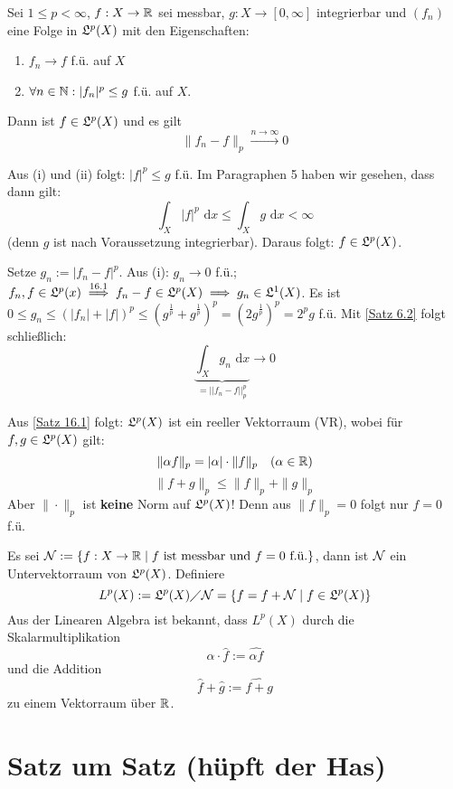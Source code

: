 \documentclass[a4paper,twoside,DIV15,BCOR12mm,chapterprefix=true,headings=onelinechapter]{scrbook}
\begin{document}
\begin{satz}
\label{Satz 16.3}
Sei $1\le p<\infty$, $f:X\to\mathbb{R}$ sei messbar, $g:X\to[0,\infty]$ integrierbar und $(f_n)$ eine Folge in $\mathfrak{L}^p(X)$ mit den Eigenschaften:
\begin{enumerate}
\item $f_n\to f$ f.ü. auf $X$
\item $\forall n\in\mathbb{N}: |f_n|^p\le g$ f.ü. auf $X$.
\end{enumerate}
Dann ist $f\in\mathfrak{L}^p(X)$ und es gilt
\[\|f_n-f\|_p\stackrel{n\to\infty}\to 0\]
\end{satz}

\begin{beweis}
Aus (i) und (ii) folgt: $|f|^p \leq g$ f.\"u.
Im Paragraphen 5 haben wir gesehen, dass dann gilt:
\[ \int_X |f|^p \text{ d}x \leq \int_X g \text{ d}x < \infty \]
(denn $g$ ist nach Voraussetzung integrierbar). 
Daraus folgt: $f \in \mathfrak{L}^p(X)$.

Setze $g_n := |f_n - f|^p$. Aus (i): $g_n \to 0$ f.\"u.; $f_n, f \in \mathfrak{L}^p(x) \overset{16.1}{\implies} f_n - f \in \mathfrak{L}^p(X) \implies g_n \in \mathfrak{L}^1(X)$.
Es ist $ 0 \leq g_n \leq \left( |f_n| + |f| \right)^p \leq \left( g^{\frac{1}{p}} + g^{\frac{1}{p}} \right)^p = \left( 2g^{\frac{1}{p}} \right)^p = 2^p g$ f.\"u.
Mit \ref{Satz 6.2} folgt schließlich:
\[ \underbrace{\int_X g_n \text{ d}x}_{=||f_n - f||_p^p} \to 0 \]
\end{beweis}

Aus \ref{Satz 16.1} folgt: $\mathfrak{L}^p(X)$ ist ein reeller Vektorraum (VR), wobei für $f,g\in\mathfrak{L}^p(X)$ gilt:
\[\|\alpha f\|_p=|\alpha|\cdot \|f\|_p\quad (\alpha\in\mathbb{R})\]
\[\|f+g\|_p\le\|f\|_p+\|g\|_p\]
Aber $\|\cdot\|_p$ ist \textbf{keine} Norm auf $\mathfrak{L}^p(X)$! Denn aus $\|f\|_p=0$ folgt nur $f=0$ f.ü.

\begin{definition}
Es sei $\mathcal{N}:=\{f:X\to\mathbb{R}\mid f\text{ ist messbar und } f=0 \text{ f.ü.}\}$, dann ist $\mathcal{N}$ ein Untervektorraum von $\mathfrak{L}^p(X)$. Definiere
\[L^p(X):=\mathfrak{L}^p(X)\diagup\mathcal{N}=\{f=f+\mathcal{N}\mid f\in\mathfrak{L}^p(X)\}\]
Aus der Linearen Algebra ist bekannt, dass $L^p(X)$ durch die Skalarmultiplikation
\[\alpha\cdot\hat f := \widehat{\alpha f}\]
und die Addition
\[\hat f+\hat g:=\widehat{f+g}\]
zu einem Vektorraum über $\mathbb{R}$.
\end{definition}

\appendix
\chapter{Satz um Satz (hüpft der Has)}
\end{document}
